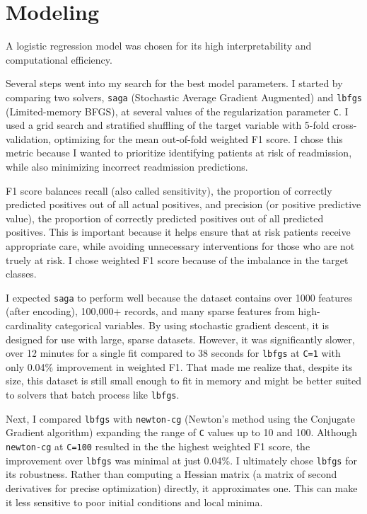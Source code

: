 \documentclass{article}      %
\begin{document}
\section{Modeling}

A logistic regression model was chosen for its high interpretability and computational efficiency. 

Several steps went into my search for the best model parameters. I started by comparing two solvers, \texttt{saga} (Stochastic Average Gradient Augmented) and \texttt{lbfgs} (Limited-memory BFGS), at several values of the regularization parameter \texttt{C}. I used a grid search and stratified shuffling of the target variable with 5-fold cross-validation, optimizing for the mean out-of-fold weighted F1 score. I chose this metric because I wanted to prioritize identifying patients at risk of readmission, while also minimizing incorrect readmission predictions.

F1 score balances recall (also called sensitivity), the proportion of correctly predicted positives out of all actual positives, and precision (or positive predictive value), the proportion of correctly predicted positives out of all predicted positives. This is important because it helps ensure that at risk patients receive appropriate care, while avoiding unnecessary interventions for those who are not truely at risk. I chose weighted F1 score because of the imbalance in the target classes.

I expected \texttt{saga} to perform well because the dataset contains over 1000 features (after encoding), 100,000+ records, and many sparse features from high-cardinality categorical variables. By using stochastic gradient descent, it is designed for use with large, sparse datasets. However, it was significantly slower, over 12 minutes for a single fit compared to 38 seconds for \texttt{lbfgs} at \texttt{C=1} with only 0.04\% improvement in weighted F1. That made me realize that, despite its size, this dataset is still small enough to fit in memory and might be better suited to solvers that batch process like \texttt{lbfgs}.

Next, I compared \texttt{lbfgs} with \texttt{newton-cg} (Newton's method using the Conjugate Gradient algorithm) expanding the range of \texttt{C} values up to 10 and 100. Although \texttt{newton-cg} at \texttt{C=100} resulted in the the highest weighted F1 score, the improvement over \texttt{lbfgs} was minimal at just 0.04\%. I ultimately chose \texttt{lbfgs} for its robustness. Rather than computing a Hessian matrix (a matrix of second derivatives for precise optimization) directly, it approximates one. This can make it less sensitive to poor initial conditions and local minima. 
\end{document}
